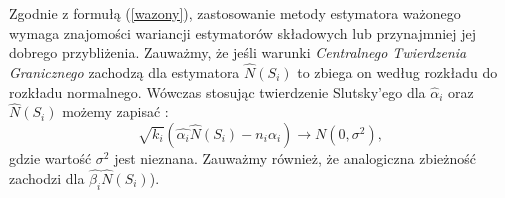Zgodnie z formułą (\ref{wazony}), zastosowanie metody estymatora ważonego wymaga znajomości wariancji  estymatorów składowych lub przynajmniej jej dobrego przybliżenia.
Zauważmy, że jeśli warunki \textit{Centralnego Twierdzenia Granicznego} zachodzą dla estymatora $\hat{N}(S_i)$ to zbiega on według rozkładu do rozkładu normalnego. Wówczas stosując twierdzenie Slutsky'ego dla $\hat{\alpha}_i$ oraz $\hat{N}(S_i)$
możemy zapisać \cite{ting}:
\begin{equation}
    \sqrt{k_i}(\hat{{\alpha}_i}\hat{N}(S_i) - n_{i}{\alpha}_{i}) \rightarrow N(0, \sigma^2),
\end{equation}
gdzie wartość $\sigma^2$ jest nieznana.
Zauważmy również, że analogiczna zbieżność zachodzi dla  $\hat{{\beta}_i}\hat{N}(S_i)$).

